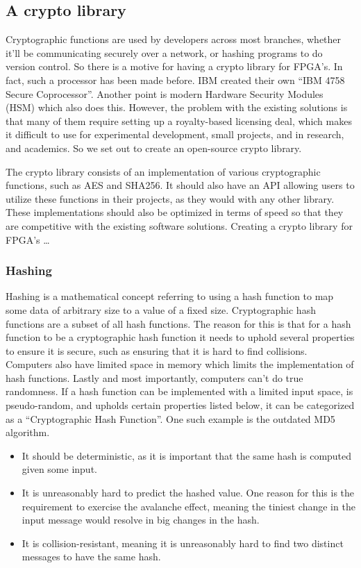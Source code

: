 \documentclass[a4paper]{article}
\begin{document}
\subsection{A crypto library}
\label{sec:orgd38c71f}
Cryptographic functions are used by developers across most branches, whether it'll be communicating securely over a network, or hashing programs to do version control.
So there is a motive for having a crypto library for FPGA's. In fact, such a processor has been made before. IBM created their own ``IBM 4758 Secure Coprocessor''\cite{IBM4758}. Another point is modern Hardware Security Modules (HSM) which also does this.
However, the problem with the existing solutions is that many of them require setting up a royalty-based licensing deal, which makes it difficult to use for experimental development, small projects, and in research, and academics.
So we set out to create an open-source crypto library.

The crypto library consists of an implementation of various cryptographic functions, such as AES and SHA256. It should also have an API allowing users to utilize these functions in their projects, as they would with any other library.
These implementations should also be optimized in terms of speed so that they are competitive with the existing software solutions.
Creating a crypto library for FPGA's \ldots{}
\subsubsection{Hashing}
\label{sec:org4445466}
Hashing is a mathematical concept referring to using a hash function to map some data of arbitrary size to a value of a fixed size. Cryptographic hash functions are a subset of all hash functions.
The reason for this is that for a hash function to be a cryptographic hash function it needs to uphold several properties to ensure it is secure, such as ensuring that it is hard to find collisions. Computers also have limited space in memory which limits the implementation of hash functions. Lastly and most importantly, computers can't do true randomness.
If a hash function can be implemented with a limited input space, is pseudo-random, and upholds certain properties listed below, it can be categorized as a ``Cryptographic Hash Function''. One such example is the outdated MD5 algorithm.
\begin{itemize}
\item It should be deterministic, as it is important that the same hash is computed given some input.
\item It is unreasonably hard to predict the hashed value. One reason for this is the requirement to exercise the avalanche effect, meaning the tiniest change in the input message would resolve in big changes in the hash.
\item It is collision-resistant, meaning it is unreasonably hard to find two distinct messages to have the same hash.
\end{itemize}
\end{document}
